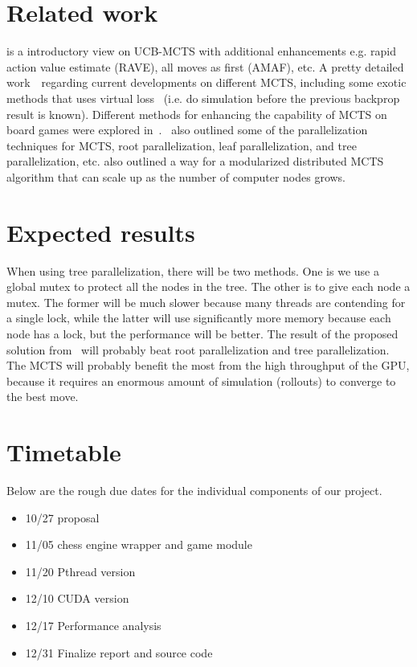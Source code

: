 \documentclass[sigconf]{acmart}
\begin{document}
\section{Related work}
\cite{appplMCTS} is a introductory view on UCB-MCTS with additional enhancements e.g. rapid action value estimate (RAVE), all moves as first (AMAF), etc. A pretty detailed work~\cite{liu2020effective}~regarding current developments on different MCTS, including some exotic methods that uses virtual loss~\cite{Liu2020Watch} (i.e. do simulation before the previous backprop result is known). Different methods for enhancing the capability of MCTS on board games were explored in~\cite{weigel2017monte}.~\cite{guillaumeMCTS}\cite{weigel2017monte} also outlined some of the parallelization techniques for MCTS, root parallelization, leaf parallelization, and tree parallelization, etc. \cite{weigel2017monte} also outlined a way for a modularized distributed MCTS algorithm that can scale up as the number of computer nodes grows. 

\section{Expected results}
When using tree parallelization, there will be two methods. One is we use a global mutex to protect all the nodes in the tree. The other is to give each node a mutex. The former will be much slower because many threads are contending for a single lock, while the latter will use significantly more memory because each node has a lock, but the performance will be better. The result of the proposed solution from~\cite{Liu2020Watch} will probably beat root parallelization and tree parallelization. The MCTS will probably benefit the most from the high throughput of the GPU, because it requires an enormous amount of simulation (rollouts) to converge to the best move.

\section{Timetable}
Below are the rough due dates for the individual components of our project. 
\begin{itemize}
  \item 10/27 proposal
  \item 11/05 chess engine wrapper and game module
  \item 11/20 Pthread version
  \item 12/10 CUDA version
  \item 12/17 Performance analysis
  \item 12/31 Finalize report and source code
  
\end{itemize}
\end{document}
